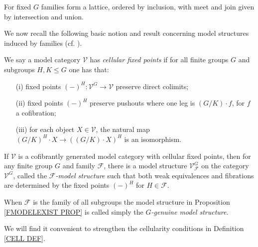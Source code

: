 \documentclass[a4paper,10pt]{article}%
\begin{document}
\begin{remark}
  For fixed $G$ families form a lattice, ordered by inclusion, 
  with meet and join given by intersection and union.
\end{remark}


We now recall the following basic notion and result concerning model structures induced by families (cf. \cite[Prop. 2.6]{Ste16}).


\begin{definition}\label{CELL DEF}
  We say a model category $\mathcal{V}$ has 
  \textit{cellular fixed points} if for all finite groups $G$ and subgroups $H,K\leq G$ one has that:
  \begin{itemize}
  \item[(i)] fixed points $(\minus)^H \colon \mathcal{V}^G \to \mathcal{V}$ preserve direct colimits;
  \item[(ii)] fixed points $(\minus)^H$ preserve pushouts where one leg is $(G/K)\cdot f$, for $f$ a cofibration;
  \item[(iii)] for each object $X \in \mathcal{V}$, the natural map 
    $(G/K)^H \cdot X \to ((G/K) \cdot X)^H$
    is an isomorphism.
  \end{itemize}
\end{definition}


\begin{proposition}\label{FMODELEXIST PROP}
  If $\mathcal{V}$ is a cofibrantly generated model category with cellular fixed points, then for any finite group $G$ and family $\mathcal{F}$, there is a model structure $\mathcal{V}^G_{\mathcal{F}}$ on the category 
  $\mathcal{V}^G$, called the 
  \emph{$\mathcal{F}$-model structure}
  such that both weak equivalences and fibrations are determined by the fixed points $(\minus)^H$ for 
  $H \in \mathcal{F}$.
\end{proposition}

When $\mathcal{F}$ is the family of all subgroups the model structure in Proposition \ref{FMODELEXIST PROP} is called simply the \textit{$G$-genuine model structure}.

We will find it convenient to strengthen the cellularity conditions in Definition \ref{CELL DEF}.
\end{document}
